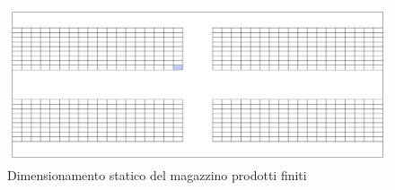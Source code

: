 \documentclass[11pt]{article}
\begin{document}
\begin{figure}[H]
    \centering
    \includegraphics[width=\textwidth]{images/Dimensionamento statico magazzino PF.png}
    \caption{Dimensionamento statico del magazzino prodotti finiti}
    \label{fig: Dimensionamento statico del magazzino prodotti finiti}
\end{figure}
\newpage
\end{document}
